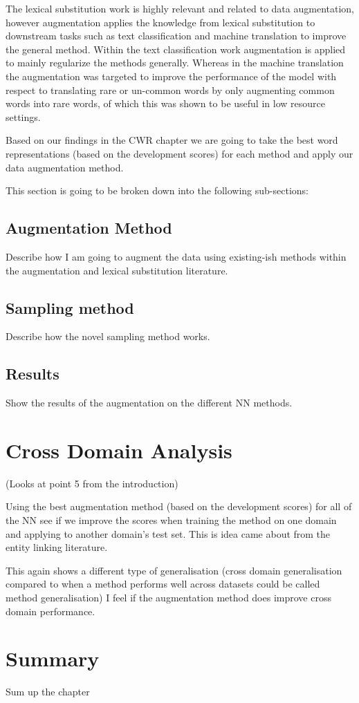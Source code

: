 The lexical substitution work is highly relevant and related to data augmentation, however augmentation applies the knowledge from lexical substitution to downstream tasks such as text classification \cite{aug_zhang_2015,aug_wang_2015,aug_kobayashi_2018,aug_wu_2018} and machine translation \cite{aug_fadaee_2017} to improve the general method. Within the text classification work augmentation is applied to mainly regularize the methods generally. Whereas in the machine translation the augmentation was targeted to improve the performance of the model with respect to translating rare or un-common words by only augmenting common words into rare words, of which this was shown to be useful in low resource settings.




Based on our findings in the CWR chapter we are going to take the best word representations (based on the development scores) for each method and apply our data augmentation method.

This section is going to be broken down into the following sub-sections:
\subsection{Augmentation Method}
Describe how I am going to augment the data using existing-ish methods within the augmentation and lexical substitution literature.
\subsection{Sampling method}
Describe how the novel sampling method works.
\subsection{Results}
Show the results of the augmentation on the different NN methods.
\section{Cross Domain Analysis}
(Looks at point 5 from the introduction)

Using the best augmentation method (based on the development scores) for all of the NN see if we improve the scores when training the method on one domain and applying to another domain's test set. This is idea came about from the entity linking literature.

This again shows a different type of generalisation (cross domain generalisation compared to when a method performs well across datasets could be called method generalisation) I feel if the augmentation method does improve cross domain performance.

\section{Summary}
Sum up the chapter
